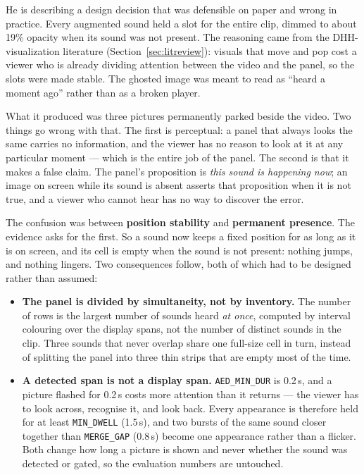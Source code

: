 \documentclass[11pt,a4paper]{article}
\begin{document}
He is describing a design decision that was defensible on paper and wrong in practice. Every
augmented sound held a slot for the entire clip, dimmed to about 19\% opacity when its sound was not
present. The reasoning came from the DHH-visualization literature (Section~\ref{sec:litreview}):
visuals that move and pop cost a viewer who is already dividing attention between the video and the
panel, so the slots were made stable. The ghosted image was meant to read as ``heard a moment ago''
rather than as a broken player.

What it produced was three pictures permanently parked beside the video. Two things go wrong with
that. The first is perceptual: a panel that always looks the same carries no information, and the
viewer has no reason to look at it at any particular moment --- which is the entire job of the panel.
The second is that it makes a false claim. The panel's proposition is \emph{this sound is happening
now}; an image on screen while its sound is absent asserts that proposition when it is not true, and
a viewer who cannot hear has no way to discover the error.

The confusion was between \textbf{position stability} and \textbf{permanent presence}. The evidence
asks for the first. So a sound now keeps a fixed position for as long as it is on screen, and its
cell is empty when the sound is not present: nothing jumps, and nothing lingers. Two consequences
follow, both of which had to be designed rather than assumed:

\begin{itemize}
  \item \textbf{The panel is divided by simultaneity, not by inventory.} The number of rows is the
    largest number of sounds heard \emph{at once}, computed by interval colouring over the display
    spans, not the number of distinct sounds in the clip. Three sounds that never overlap share one
    full-size cell in turn, instead of splitting the panel into three thin strips that are empty most
    of the time.
  \item \textbf{A detected span is not a display span.} \texttt{AED\_MIN\_DUR} is 0.2\,s, and a
    picture flashed for 0.2\,s costs more attention than it returns --- the viewer has to look
    across, recognise it, and look back. Every appearance is therefore held for at least
    \texttt{MIN\_DWELL} (1.5\,s), and two bursts of the same sound closer together than
    \texttt{MERGE\_GAP} (0.8\,s) become one appearance rather than a flicker. Both change how long a
    picture is shown and never whether the sound was detected or gated, so the evaluation numbers are
    untouched.
\end{itemize}
\end{document}
